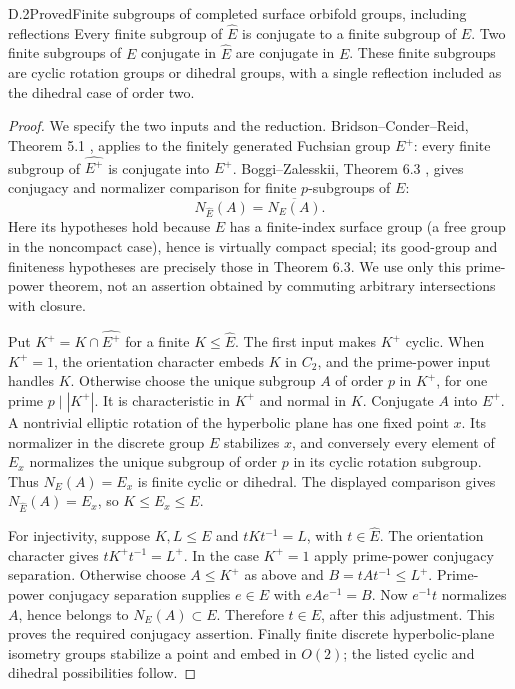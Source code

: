 \begin{claim}{D.2}{Proved}{Finite subgroups of completed surface orbifold groups, including reflections}
Every finite subgroup of $\widehat E$ is conjugate to a finite subgroup of $E$. Two finite subgroups of $E$ conjugate in $\widehat E$ are conjugate in $E$. These finite subgroups are cyclic rotation groups or dihedral groups, with a single reflection included as the dihedral case of order two.
\end{claim}
\begin{proof}
We specify the two inputs and the reduction. Bridson--Conder--Reid, Theorem 5.1 \cite{R-BCR}, applies to the finitely generated Fuchsian group $E^+$: every finite subgroup of $\widehat{E^+}$ is conjugate into $E^+$. Boggi--Zalesskii, Theorem 6.3 \cite{R-BZ}, gives conjugacy and normalizer comparison for finite $p$-subgroups of $E$:
\[
N_{\widehat E}(A)=\overline{N_E(A)}.
\]
Here its hypotheses hold because $E$ has a finite-index surface group (a free group in the noncompact case), hence is virtually compact special; its good-group and finiteness hypotheses are precisely those in Theorem 6.3. We use only this prime-power theorem, not an assertion obtained by commuting arbitrary intersections with closure.

Put $K^+=K\cap\widehat{E^+}$ for a finite $K\leq\widehat E$. The first input makes $K^+$ cyclic. When $K^+=1$, the orientation character embeds $K$ in $C_2$, and the prime-power input handles $K$. Otherwise choose the unique subgroup $A$ of order $p$ in $K^+$, for one prime $p\mid |K^+|$. It is characteristic in $K^+$ and normal in $K$. Conjugate $A$ into $E^+$. A nontrivial elliptic rotation of the hyperbolic plane has one fixed point $x$. Its normalizer in the discrete group $E$ stabilizes $x$, and conversely every element of $E_x$ normalizes the unique subgroup of order $p$ in its cyclic rotation subgroup. Thus $N_E(A)=E_x$ is finite cyclic or dihedral. The displayed comparison gives $N_{\widehat E}(A)=E_x$, so $K\leq E_x\leq E$.

For injectivity, suppose $K,L\leq E$ and $tKt^{-1}=L$, with $t\in\widehat E$. The orientation character gives $tK^+t^{-1}=L^+$. In the case $K^+=1$ apply prime-power conjugacy separation. Otherwise choose $A\leq K^+$ as above and $B=tAt^{-1}\leq L^+$. Prime-power conjugacy separation supplies $e\in E$ with $eAe^{-1}=B$. Now $e^{-1}t$ normalizes $A$, hence belongs to $N_E(A)\subset E$. Therefore $t\in E$, after this adjustment. This proves the required conjugacy assertion. Finally finite discrete hyperbolic-plane isometry groups stabilize a point and embed in $O(2)$; the listed cyclic and dihedral possibilities follow.
\end{proof}

